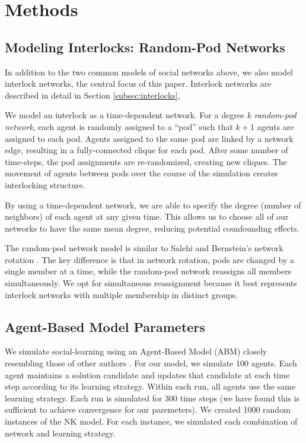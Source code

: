 \documentclass[manuscript,screen,review,acmsmall]{acmart}
\begin{document}
\section{Methods\label{sec:methods}}

\subsection{Modeling Interlocks: Random-Pod Networks\label{subsec:randompod}}
In addition to the two common models of social networks above,
we also model interlock networks,
the central focus of this paper.
Interlock networks are described in detail in Section \ref{subsec:interlocks},

We model an interlock as a time-dependent network.
For a degree $k$ {\em random-pod network},
each agent is randomly assigned to a ``pod''
such that $k+1$ agents are assigned to each pod.
Agents assigned to the same pod are linked by a network edge,
resulting in a fully-connected clique for each pod.
After some number of time-steps, the pod assignments are re-randomized,
creating new cliques.
The movement of agents between pods over the course of the simulation
creates interlocking structure.

By using a time-dependent network, we are able to specify the degree (number of neighbors) of each agent at any given time.
This allows us to choose all of our networks to have the same mean degree,
reducing potential counfounding effects.

The random-pod network model is similar to Salehi and Bernstein's network rotation
\cite{salehi_hive:_2018}.
The key difference is that in network rotation,
pods are changed by a single member at a time, while the random-pod network
reassigns all members simultaneously.
We opt for simultaneous reassignment because it best represents interlock networks
with multiple membership in distinct groups.

\subsection{Agent-Based Model Parameters}
We simulate social-learning using an Agent-Based Model (ABM) closely resembling those of other authors \cite{
lazer_network_2007,
barkoczi_social_2016,
gomez_clustering_2019}.
For our model, we simulate 100 agents.
Each agent maintains a solution candidate and updates that candidate
at each time step according to its learning strategy.
Within each run, all agents use the same learning strategy.
Each run is simulated for 300 time steps
(we have found this is sufficient to achieve convergence for our paremeters).
We created 1000 random instances of the NK model.
For each instance, we simulated each combination of network and learning strategy.
\end{document}
